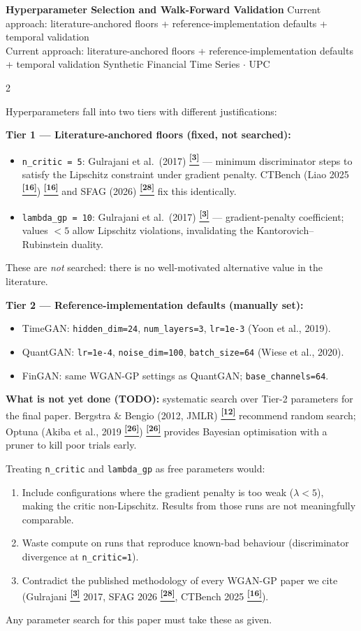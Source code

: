 \documentclass[10pt]{article}
\newcommand{\navybox}[2]{\begin{tcolorbox}[mybox={Navy}{LBg},title={#1}]#2\end{tcolorbox}}
\newcommand{\redbox}[2]{\begin{tcolorbox}[mybox={DRed}{RBg},title={#1}]#2\end{tcolorbox}}
\newcommand{\pagehead}[2]{%
  \begin{tcolorbox}[enhanced,arc=0pt,outer arc=0pt,boxrule=0pt,
    colback=Navy,colframe=Navy,
    top=5pt,bottom=5pt,left=8pt,right=8pt,
    before skip=0pt,after skip=10pt]
  {\color{white}\large\bfseries #1}%
  \ifx\relax#2\relax\else\\[1pt]{\color{blue!30!white}\small #2}\fi
  \hfill{\color{blue!20!white}\footnotesize Synthetic Financial Time Series $\cdot$ UPC}
  \end{tcolorbox}}
\newcommand{\tcite}[1]{%
  \hyperlink{R:#1}{\textsuperscript{\scriptsize\textbf{[#1]}}}}
\begin{document}
\clearpage

\pagehead{Hyperparameter Selection and Walk-Forward Validation}
         {Current approach: literature-anchored floors + reference-implementation defaults + temporal validation}

\begin{multicols}{2}

\navybox{Hyperparameter Selection: Two Tiers}{%
Hyperparameters fall into two tiers with different justifications:

\smallskip
\textbf{Tier 1 --- Literature-anchored floors (fixed, not searched):}
\begin{itemize}
  \item \texttt{n\_critic = 5}: Gulrajani et al.\ (2017)\tcite{3} --- minimum discriminator steps to satisfy the Lipschitz constraint under gradient penalty. CTBench (Liao 2025\tcite{16})\tcite{16} and SFAG (2026)\tcite{28} fix this identically.
  \item \texttt{lambda\_gp = 10}: Gulrajani et al.\ (2017)\tcite{3} --- gradient-penalty coefficient; values $< 5$ allow Lipschitz violations, invalidating the Kantorovich--Rubinstein duality.
\end{itemize}
These are \emph{not} searched: there is no well-motivated alternative value in the literature.

\smallskip
\textbf{Tier 2 --- Reference-implementation defaults (manually set):}
\begin{itemize}
  \item TimeGAN: \texttt{hidden\_dim=24}, \texttt{num\_layers=3}, \texttt{lr=1e-3} (Yoon et al., 2019).
  \item QuantGAN: \texttt{lr=1e-4}, \texttt{noise\_dim=100}, \texttt{batch\_size=64} (Wiese et al., 2020).
  \item FinGAN: same WGAN-GP settings as QuantGAN; \texttt{base\_channels=64}.
\end{itemize}

\textbf{What is not yet done (TODO):} systematic search over Tier-2 parameters for the final paper. Bergstra \& Bengio (2012, JMLR)\tcite{12} recommend random search; Optuna (Akiba et al., 2019\tcite{26})\tcite{26} provides Bayesian optimisation with a pruner to kill poor trials early.}

\redbox{Why These Floors Cannot Be Grid-Searched}{%
Treating \texttt{n\_critic} and \texttt{lambda\_gp} as free parameters would:
\begin{enumerate}
  \item Include configurations where the gradient penalty is too weak ($\lambda < 5$), making the critic non-Lipschitz. Results from those runs are not meaningfully comparable.
  \item Waste compute on runs that reproduce known-bad behaviour (discriminator divergence at \texttt{n\_critic=1}).
  \item Contradict the published methodology of every WGAN-GP paper we cite (Gulrajani\tcite{3} 2017, SFAG 2026\tcite{28}, CTBench 2025\tcite{16}).
\end{enumerate}
Any parameter search for this paper must take these as given.}


\end{multicols}
\end{document}
